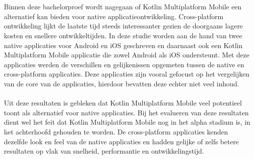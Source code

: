 
%
%

%



\chapter*{}

Binnen deze bachelorproef wordt nagegaan of Kotlin Multiplatform Mobile een alternatief kan bieden voor native applicatieontwikkeling. Cross-platform ontwikkeling lijkt de laatste tijd steeds interessanter gezien de doorgaans lagere kosten en snellere ontwikkeltijden. In deze studie worden aan de hand van twee native applicaties voor Android en iOS geschreven en daarnaast ook een Kotlin Multiplatform Mobile applicatie die zowel Android als iOS ondersteunt. Met deze applicaties werden de verschillen en gelijkenissen opgemeten tussen de native en cross-platform applicaties. Deze applicaties zijn vooral gefocust op het vergelijken van de core van de applicaties, hierdoor bevatten deze echter niet veel inhoud. 
\\ \\
Uit deze resultaten is gebleken dat Kotlin Multiplatform Mobile veel potentieel toont als alternatief voor native applicaties. Bij het evalueren van deze resultaten dient wel het feit dat Kotlin Multiplatform Mobile nog in het alpha stadium is, in het achterhoofd gehouden te worden. De cross-platform applicaties kenden dezelfde look en feel van de native applicaties en hadden gelijke of zelfs betere resultaten op vlak van snelheid, performantie en ontwikkelingstijd. 
\\ \\

